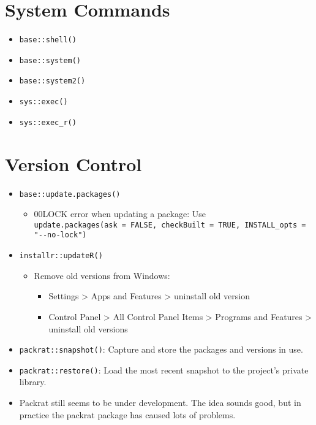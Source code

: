 \documentclass[
]{book}
\providecommand{\tightlist}{%
  \setlength{\itemsep}{0pt}\setlength{\parskip}{0pt}}
\begin{document}
\hypertarget{system-commands}{%
\section{System Commands}\label{system-commands}}

\begin{itemize}
\tightlist
\item
  \texttt{base::shell()}
\item
  \texttt{base::system()}
\item
  \texttt{base::system2()}
\item
  \texttt{sys::exec()}
\item
  \texttt{sys::exec\_r()}
\end{itemize}

\hypertarget{version-control}{%
\section{Version Control}\label{version-control}}

\begin{itemize}
\tightlist
\item
  \texttt{base::update.packages()}

  \begin{itemize}
  \tightlist
  \item
    00LOCK error when updating a package: Use \texttt{update.packages(ask\ =\ FALSE,\ checkBuilt\ =\ TRUE,\ INSTALL\_opts\ =\ "-\/-no-lock")}
  \end{itemize}
\item
  \texttt{installr::updateR()}

  \begin{itemize}
  \tightlist
  \item
    Remove old versions from Windows:

    \begin{itemize}
    \tightlist
    \item
      Settings \textgreater{} Apps and Features \textgreater{} uninstall old version
    \item
      Control Panel \textgreater{} All Control Panel Items \textgreater{} Programs and Features \textgreater{} uninstall old versions
    \end{itemize}
  \end{itemize}
\item
  \texttt{packrat::snapshot()}: Capture and store the packages and versions in use.
\item
  \texttt{packrat::restore()}: Load the most recent snapshot to the project's private library.
\item
  Packrat still seems to be under development. The idea sounds good, but in practice the packrat package has caused lots of problems.
\end{itemize}
\end{document}
